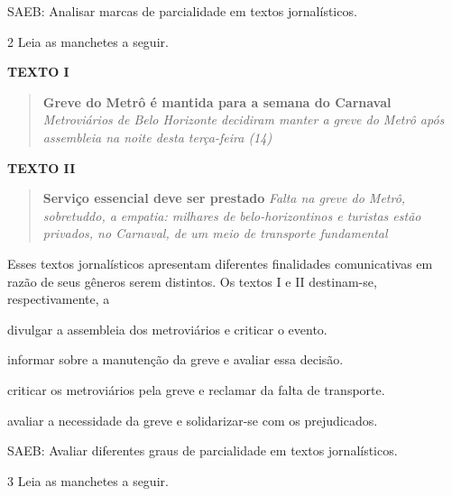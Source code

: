 SAEB: Analisar marcas de parcialidade em textos jornalísticos.

\num{2} Leia as manchetes a seguir.

\textbf{TEXTO I}

\begin{quote}
\textbf{Greve do Metrô é mantida para a semana do Carnaval}
\emph{Metroviários de Belo Horizonte decidiram manter a greve do Metrô
após assembleia na noite desta terça-feira (14)}
\end{quote}


\textbf{TEXTO II}

\begin{quote}
\textbf{Serviço essencial deve ser prestado} \emph{Falta na greve do
Metrô, sobretuddo, a empatia: milhares de belo-horizontinos e turistas
estão privados, no Carnaval, de um meio de transporte fundamental}
\end{quote}


Esses textos jornalísticos apresentam diferentes finalidades
comunicativas em razão de seus gêneros serem distintos. Os textos I e II
destinam-se, respectivamente, a

\begin{escolha}
\item divulgar a assembleia dos metroviários e criticar o evento.

\item informar sobre a manutenção da greve e avaliar essa decisão.

\item criticar os metroviários pela greve e reclamar da falta de
transporte.

\item avaliar a necessidade da greve e solidarizar-se com os prejudicados.
\end{escolha}

SAEB: Avaliar diferentes graus de parcialidade em textos jornalísticos.

\num{3} Leia as manchetes a seguir.

